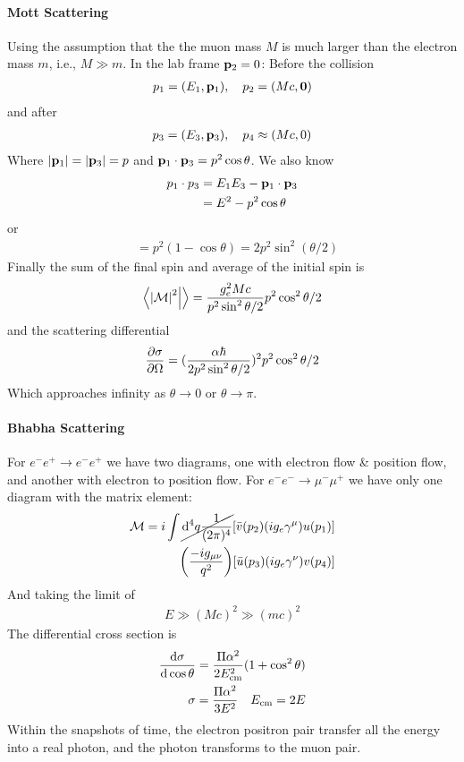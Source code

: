 \documentclass[../main.tex]{subfiles}
\begin{document}
\paragraph*{Mott Scattering}
Using the assumption that the the muon mass $M$ is much larger than the electron mass $m$, i.e., $M \gg m$.
In the lab frame $\vb p_2 = 0$: Before the collision
\begin{align*}
    p_1 = (E_1, \vb p_1), \quad p_2 = (Mc, \vb 0) 
\end{align*}
and after
\begin{align*}
    p_3 = (E_3, \vb p_3), \quad p_4 \approx (Mc,0)
\end{align*}
Where $\abs{\vb p_1} = \abs{\vb p_3} = p$ and $\vb p_1 \cdot \vb p_3 = p^2 \cos\theta$. We also know
\begin{align*}
    p_1 \cdot p_3 &= E_1 E_3 - \vb p_1 \cdot \vb p_3 \\
    &= E^2 - p^2 \cos\theta
\end{align*}
or 
\begin{align*}
    &= p^2(1 - \cos\theta) = 2 p^2 \sin^2(\theta/2)
\end{align*}
Finally the sum of the final spin and average of the initial spin is
\begin{align*}
    \bra {\abs{\mathcal{M}}^2} \ket = \frac{g_e^2 Mc}{p^2 \sin^2{\theta/2}} p^2 \cos^2{\theta/2}
\end{align*}
and the scattering differential
\begin{align*}
    \pdv{\sigma}{\Omega} = (\frac{\alpha \hbar}{2 p^2 \sin^2{\theta/2}})^2 p^2 \cos^2{\theta/2}
\end{align*}
Which approaches infinity as $\theta \to 0$ or $\theta \to \pi$.

\newpage
{}
\paragraph*{Bhabha Scattering}
For $e^- e^+ \to e^- e^+$ we have two diagrams, one with electron flow \& position flow, and another
with electron to position flow. For $e^- e^- \to \mu^- \mu^+$ we have only one diagram with the 
matrix element:
\begin{align*}
    \mathcal{M} = i \int \cancel{\dd^4{q}\frac{1}{(2\pi)^4}} [\bar v(p_2) (i g_e \gamma^\mu) u(p_1)] \\
    \qt(\frac{-ig_{\mu\nu}}{q^2}) [\bar u(p_3) (i g_e \gamma^\nu) v(p_4)] \\
\end{align*}
And taking the limit of
\begin{align*}
    E \gg (Mc)^2 \gg (mc)^2
\end{align*}
The differential cross section is
\begin{align*}
    \dv{\sigma}{\cos\theta} = \frac{\Pi \alpha^2}{2 E_{\text{cm}}^2} (1 + \cos^2\theta) \\
    \sigma = \frac{\Pi \alpha^2}{3 E^2} \quad E_{\text{cm}} = 2E
\end{align*}
Within the snapshots of time, the electron positron pair transfer all the energy into a real photon,
and the photon transforms to the muon pair.
\end{document}
